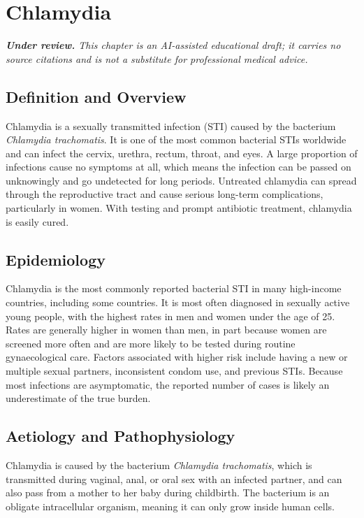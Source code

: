 \chapter{Chlamydia}

\medskip
\noindent\textit{\textbf{Under review.} This chapter is an AI-assisted educational draft; it carries no source citations and is not a substitute for professional medical advice.}

\section*{Definition and Overview}
Chlamydia is a sexually transmitted infection (STI) caused by the bacterium \textit{Chlamydia trachomatis}. It is one of the most common bacterial STIs worldwide and can infect the cervix, urethra, rectum, throat, and eyes. A large proportion of infections cause no symptoms at all, which means the infection can be passed on unknowingly and go undetected for long periods. Untreated chlamydia can spread through the reproductive tract and cause serious long-term complications, particularly in women. With testing and prompt antibiotic treatment, chlamydia is easily cured.

\section*{Epidemiology}
Chlamydia is the most commonly reported bacterial STI in many high-income countries, including some countries. It is most often diagnosed in sexually active young people, with the highest rates in men and women under the age of 25. Rates are generally higher in women than men, in part because women are screened more often and are more likely to be tested during routine gynaecological care. Factors associated with higher risk include having a new or multiple sexual partners, inconsistent condom use, and previous STIs. Because most infections are asymptomatic, the reported number of cases is likely an underestimate of the true burden.

\section*{Aetiology and Pathophysiology}
Chlamydia is caused by the bacterium \textit{Chlamydia trachomatis}, which is transmitted during vaginal, anal, or oral sex with an infected partner, and can also pass from a mother to her baby during childbirth. The bacterium is an obligate intracellular organism, meaning it can only grow inside human cells.

